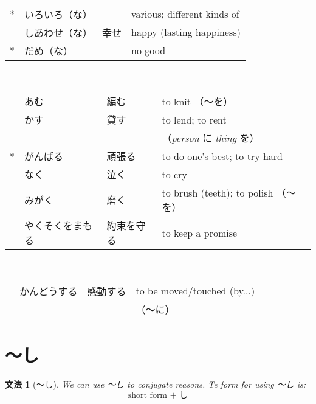 \documentclass[notoc,notitlepage]{tufte-book}
\newtheorem{grammar}{文法}[section]
\begin{document}
 \\
\begin{tabular}{r l l l}
  *  & いろいろ（な） &      & various; different kinds of \\
     & しあわせ（な） & 幸せ & happy (lasting happiness) \\
  *  & だめ（な）     &      & no good
\end{tabular}

 \\
\begin{tabular}{r l l l}
      & あむ             & 編む       & to knit （〜を） \\
      & かす             & 貸す       & to lend; to rent \\
      &                  &            & （\textit{person} に \textit{thing} を） \\
  *   & がんばる         & 頑張る     & to do one's best; to try hard \\
      & なく             & 泣く       & to cry \\
      & みがく           & 磨く       & to brush (teeth); to polish （〜を） \\
      & やくそくをまもる & 約束を守る & to keep a promise
\end{tabular}

 \\
\begin{tabular}{r l l l}
      & かんどうする & 感動する & to be moved/touched (by...) \\
      &              &          & （〜に）
\end{tabular}

\section{〜し}

\begin{grammar}[〜し]
\label{grammar:_shi}
  We can use 〜し to conjugate reasons. Te form for using 〜し is:
  \begin{equation*}
    \text{ short form } + \text{ し }
  \end{equation*}
\end{grammar}
\end{document}
